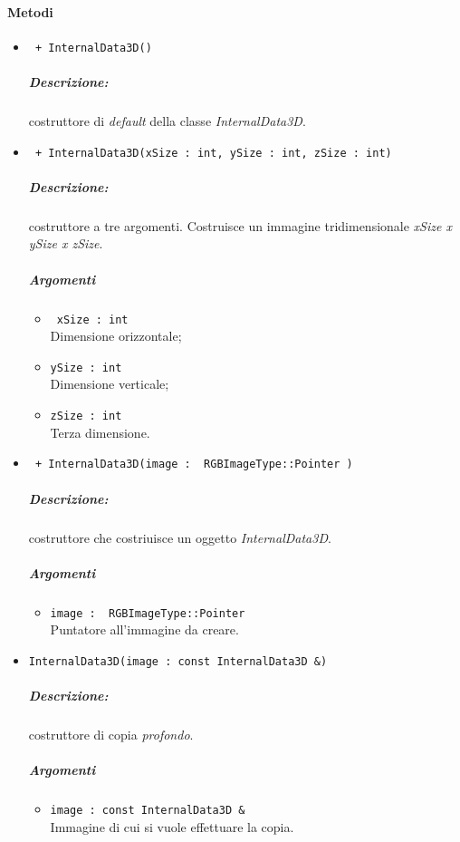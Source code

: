 \color{black}
\paragraph{Metodi}
	\begin{itemize}
		\item \color{blue}\verb! + InternalData3D()! 
		\color{black} 
		\subparagraph{Descrizione:} costruttore di \emph{default} della classe \textsl{InternalData3D}.

		\item \color{blue}\verb! + InternalData3D(xSize : int, ySize : int, zSize : int)! 
		\color{black} 
		\subparagraph{Descrizione:} costruttore a tre argomenti. Costruisce un immagine tridimensionale \textit{xSize x ySize x zSize}. 
		\subparagraph{Argomenti}
			\begin{itemize}
				\item \color{RoyalPurple}\verb! xSize : int! \\ 
				\color{black}Dimensione orizzontale;
				
				\item \color{RoyalPurple} \verb!ySize : int! \\ 
				\color{black}Dimensione verticale;
				
				\item \color{RoyalPurple}\verb!zSize : int! \\ 
				\color{black}Terza dimensione.
			\end{itemize}
			
		\item \color{blue}\verb! + InternalData3D(image :  RGBImageType::Pointer )!
		\color{black}
		\subparagraph{Descrizione:} costruttore che costriuisce un oggetto \textsl{InternalData3D}.
		\subparagraph{Argomenti}
			\begin{itemize}
				\item \color{RoyalPurple}\verb!image :  RGBImageType::Pointer!\\
				\color{black}Puntatore all'immagine da creare.
			\end{itemize}		
			
		\item \color{blue}\verb!InternalData3D(image : const InternalData3D &)!
		\color{black}
		\subparagraph{Descrizione:} costruttore di copia \emph{profondo}.
		\subparagraph{Argomenti}
			\begin{itemize}
				\item \color{RoyalPurple}\verb!image : const InternalData3D &!\\
				\color{black}Immagine di cui si vuole effettuare la copia.
			\end{itemize}
			

\end{itemize}
